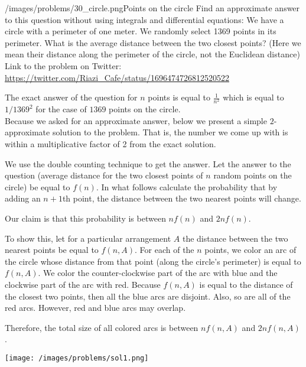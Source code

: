 \begin{problem}{/images/problems/30_circle.png}{Points on the circle}
	Find an approximate answer to this question without using integrals and differential equations:
We have a circle with a perimeter of one meter. We randomly select 1369 points in its perimeter. What is the average distance between the two closest points? (Here we mean their distance along the perimeter of the circle, not the Euclidean distance)\\[0.2cm]

Link to the problem on Twitter:  \url{https://twitter.com/Riazi_Cafe/status/1696474726812520522}
\end{problem}
\begin{solution}
The exact answer of the question for $n$ points is equal to $\frac{1}{n^2}$ which is equal to $1/1369^2$ for the case of $1369$ points on the circle.\\[0.2cm]

Because we asked for an approximate answer, below we present a simple $2$-approximate solution to the problem. That is, the number we come up with is within a multiplicative factor of 2 from the exact solution.

We use the double counting technique to get the answer. Let the answer to the question (average distance for the two closest points of $n$ random points on the circle) be equal to $f(n)$. In what follows calculate the probability that by adding an $n+1$th point, the distance between the two nearest points will change.

Our claim is that this probability is between $nf(n)$ and $2nf(n)$.

To show this, let for a particular arrangement $A$ the distance between the two nearest points be equal to $f(n,A)$.
For each of the $n$ points, we color an arc of the circle whose distance from that point (along the circle's perimeter) is equal to $f(n,A)$.
We color the counter-clockwise part of the arc with blue and the clockwise part of the arc with red.
Because $f(n,A)$ is equal to the distance of the closest two points, then all the blue arcs are disjoint.
Also, so are all of the red arcs.
However, red and blue arcs may overlap.

Therefore, the total size of all colored arcs is between
$nf(n,A)$
and
$2nf(n,A)$.

\begin{center}
	\texttt{[image: /images/problems/sol1.png]}
\end{center}


\end{solution}
